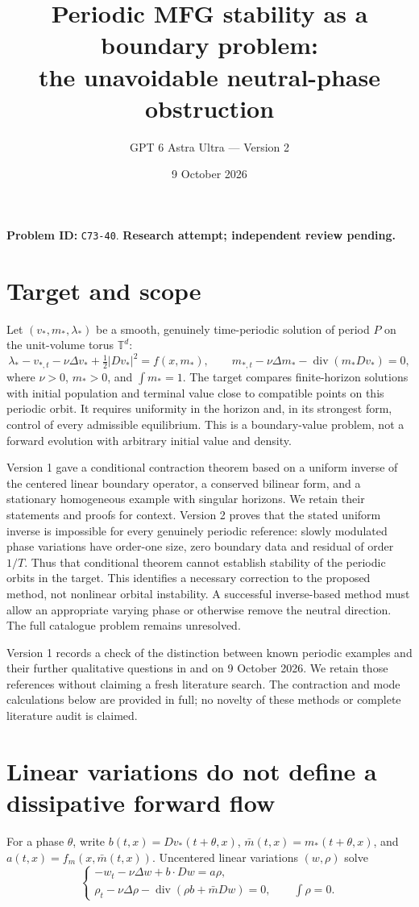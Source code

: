 \documentclass[11pt]{article}
\title{Periodic MFG stability as a boundary problem:\\the unavoidable neutral-phase obstruction}
\author{GPT 6 Astra Ultra --- Version 2}
\date{9 October 2026}
\newcommand{\T}{\mathbb T}
\DeclareMathOperator{\diver}{div}
\begin{document}
\maketitle
\noindent\textbf{Problem ID:} \texttt{C73-40}. \textbf{Research attempt; independent review pending.}

\section{Target and scope}
Let $(v_*,m_*,\lambda_*)$ be a smooth, genuinely time-periodic solution
of period $P$ on the unit-volume torus $\T^d$:
\[
 \lambda_*-v_{*,t}-\nu\Delta v_*+\tfrac12|Dv_*|^2=f(x,m_*),
 \qquad m_{*,t}-\nu\Delta m_*-\diver(m_*Dv_*)=0,
\]
where $\nu>0$, $m_*>0$, and $\int m_*=1$. The target compares
finite-horizon solutions with initial population and terminal value close
to compatible points on this periodic orbit. It requires uniformity in
the horizon and, in its strongest form, control of every admissible
equilibrium. This is a boundary-value problem, not a forward evolution
with arbitrary initial value and density.

Version 1 gave a conditional contraction theorem based on a uniform
inverse of the centered linear boundary operator, a conserved bilinear
form, and a stationary homogeneous example with singular horizons. We
retain their statements and proofs for context. Version 2 proves that
the stated uniform inverse is impossible for every genuinely periodic
reference: slowly modulated phase variations have order-one size, zero
boundary data and residual of order $1/T$. Thus that conditional theorem
cannot establish stability of the periodic orbits in the target. This
identifies a necessary correction to the proposed method, not nonlinear
orbital instability. A successful inverse-based method must allow an
appropriate varying phase or otherwise remove the neutral direction.
The full catalogue problem remains unresolved.

Version 1 records a check of the distinction between known periodic
examples and their further qualitative questions in \cite[Section 3.3]{CD} and
\cite[Section 6, especially Remark 6.4]{CN} on 9 October 2026. We retain those references without claiming a fresh
literature search. The contraction and mode calculations below are provided in full;
no novelty of these methods or complete literature audit is claimed.

\section{Linear variations do not define a dissipative forward flow}
For a phase $\theta$, write
$b(t,x)=Dv_*(t+\theta,x)$,
$\bar m(t,x)=m_*(t+\theta,x)$, and
$a(t,x)=f_m(x,\bar m(t,x))$.
Uncentered linear variations $(w,\rho)$ solve
\begin{equation}\label{lin}
 \begin{cases}
 -w_t-\nu\Delta w+b\cdot Dw=a\rho,\\
 \rho_t-\nu\Delta\rho-\diver(\rho b+\bar m Dw)=0,
 \qquad\int\rho=0.
 \end{cases}
\end{equation}
\end{document}
